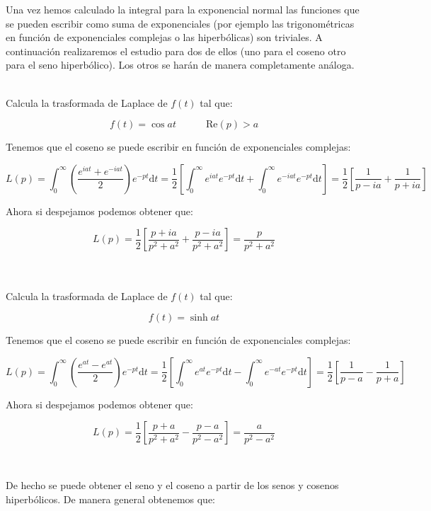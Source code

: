 \documentclass[12pt]{book}
\newcommand{\parentesis}[1]{\left( #1  \right)}
\newcommand{\D}{\mathrm{d}}
\newcommand{\Real}{\mathrm{Re}}
\newcommand{\into}{\int_{0}^{\infty}}
\newcommand{\tquad}{\quad  \quad \quad}
\begin{document}
Una vez hemos calculado la integral para la exponencial normal las funciones que se pueden escribir como suma de exponenciales (por ejemplo las trigonométricas en función de exponenciales complejas o las hiperbólicas) son triviales. A continuación realizaremos el estudio para dos de ellos (uno para el coseno otro para el seno hiperbólico). Los otros se harán de manera completamente análoga. \\



\begin{flushleft}

\hrulefill \\
Calcula la trasformada de Laplace de $f(t)$ tal que:

$$ f(t) = \cos at \tquad \Real(p) > a $$

Tenemos que el coseno se puede escribir en función de exponenciales complejas:

$$ L(p) = \into \parentesis{\dfrac{e^{iat}+e^{-iat}}{2}} e^{-pt} \D t = \dfrac{1}{2} \left[ \into e^{iat} e^{-pt} \D t + \into e^{-iat} e^{-pt} \D t \right] = \dfrac{1}{2} \left[ \dfrac{1}{p-ia} + \dfrac{1}{p+ia} \right] $$

Ahora si despejamos podemos obtener que:

$$ L(p) = \dfrac{1}{2} \left[ \dfrac{p+ia}{p^2+a^2} + \dfrac{p-ia}{p^2+a^2} \right] = \dfrac{p}{p^2 + a^2}  $$

\hrulefill \\

\hrulefill \\
Calcula la trasformada de Laplace de $f(t)$ tal que:

$$ f(t) = \sinh at $$

Tenemos que el coseno se puede escribir en función de exponenciales complejas:

$$ L(p) = \into \parentesis{\dfrac{e^{at}-e^{at}}{2}} e^{-pt} \D t = \dfrac{1}{2} \left[ \into e^{at} e^{-pt} \D t - \into e^{-at} e^{-pt} \D t \right] = \dfrac{1}{2} \left[ \dfrac{1}{p-a} - \dfrac{1}{p+a} \right] $$

Ahora si despejamos podemos obtener que:

$$ L(p) = \dfrac{1}{2} \left[ \dfrac{p+a}{p^2+a^2} - \dfrac{p - a}{p^2 - a^2} \right] = \dfrac{a}{p^2 - a^2}  $$

\hrulefill \\ 
\end{flushleft}


De hecho se puede obtener el seno y el coseno a partir de los senos y cosenos hiperbólicos. De manera general obtenemos que:
\end{document}
